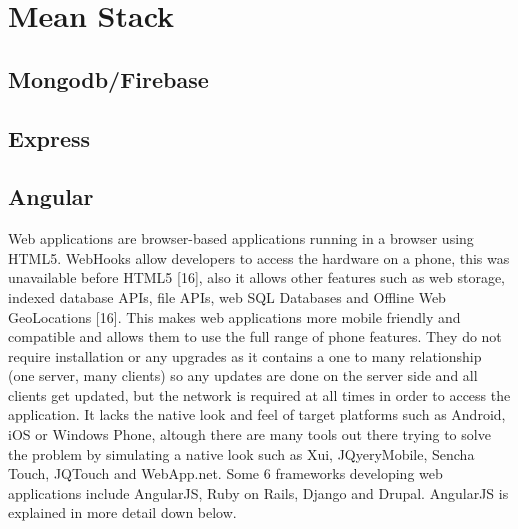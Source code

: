 \section{Mean Stack}
\subsection{Mongodb/Firebase}
\subsection{Express}
\subsection{Angular}
Web applications are browser-based applications running in a browser
using HTML5. WebHooks allow developers to access the hardware on a
phone, this was unavailable before HTML5 [16], also it allows other features
such as web storage, indexed database APIs, file APIs, web SQL Databases and
Offline Web GeoLocations [16]. This makes web applications more mobile
friendly and compatible and allows them to use the full range of phone
features. They do not require installation or any upgrades as it contains a one
to many relationship (one server, many clients) so any updates are done on
the server side and all clients get updated, but the network is required at all
times in order to access the application. It lacks the native look and feel of
target platforms such as Android, iOS or Windows Phone, altough there are
many tools out there trying to solve the problem by simulating a native look
such as Xui, JQyeryMobile, Sencha Touch, JQTouch and WebApp.net. Some
6
frameworks developing web applications include AngularJS, Ruby on Rails,
Django and Drupal. AngularJS is explained in more detail down below.

